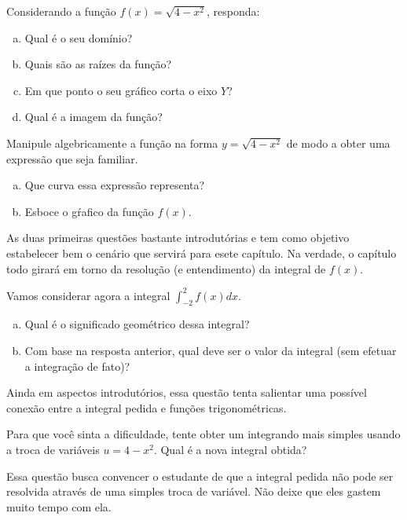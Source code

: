 \documentclass[main_estudante.tex]{subfiles}
\begin{document}
\begin{questao}
Considerando a função $f(x)=\sqrt{4-x^2}$, responda:
\begin{enumerate}[a)]
\item Qual é o seu domínio?
\item Quais são as raízes da função?
\item Em que ponto o seu gráfico corta o eixo $Y$?
\item Qual é a imagem da função?
\end{enumerate}
\end{questao}

\begin{questao}
Manipule algebricamente a função na forma $y=\sqrt{4-x^2}$ de modo a obter uma expressão que seja familiar. 
\begin{enumerate}[a)]
\item Que curva essa expressão representa?
\item Esboce o gŕafico da função $f(x)$.
\end{enumerate}
\end{questao}

As duas primeiras questões bastante introdutórias e tem como objetivo estabelecer bem o cenário que servirá para esete capítulo. Na verdade, o capítulo todo girará em torno da resolução (e entendimento) da integral de $f(x)$.

\begin{questao}
Vamos considerar agora a integral $\int_{-2}^{2} f(x)dx$.
\begin{enumerate}[a)]
\item Qual é o significado geométrico dessa integral?
\item Com base na resposta anterior, qual deve ser o valor da integral (sem efetuar a integração de fato)?
\end{enumerate}
\end{questao}

Ainda em aspectos introdutórios, essa questão tenta salientar uma possível conexão entre a integral pedida e funções trigonométricas.

\begin{questao}
Para que você sinta a dificuldade, tente obter um integrando mais simples usando a troca de variáveis $u=4-x^2$. Qual é a nova integral obtida?
\end{questao}

Essa questão busca convencer o estudante de que a integral pedida não pode ser resolvida através de uma simples troca de variável. Não deixe que eles gastem muito tempo com ela.
\end{document}
